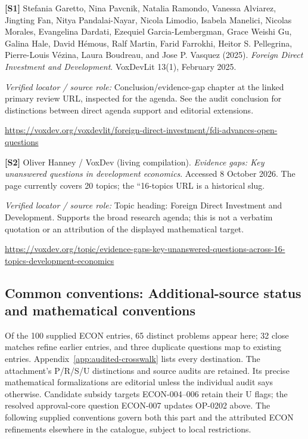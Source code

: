 \documentclass[11pt,a4paper]{article}
\begin{document}
{\footnotesize\raggedright
\par\noindent\textbf{[S1]} Stefania Garetto, Nina Pavcnik, Natalia Ramondo, Vanessa Alviarez, Jingting Fan, Nitya Pandalai-Nayar, Nicola Limodio, Isabela Manelici, Nicolas Morales, Evangelina Dardati, Ezequiel Garcia-Lembergman, Grace Weishi Gu, Galina Hale, David Hémous, Ralf Martin, Farid Farrokhi, Heitor S. Pellegrina, Pierre-Louis Vézina, Laura Boudreau, and Jose P. Vasquez (2025). \emph{Foreign Direct Investment and Development}. VoxDevLit 13(1), February 2025.\par \textit{Verified locator / source role:} Conclusion/evidence-gap chapter at the linked primary review URL, inspected for the agenda. See the audit conclusion for distinctions between direct agenda support and editorial extensions.\par \url{https://voxdev.org/voxdevlit/foreign-direct-investment/fdi-advances-open-questions}\par\smallskip
\par\noindent\textbf{[S2]} Oliver Hanney / VoxDev (living compilation). \emph{Evidence gaps: Key unanswered questions in development economics}. Accessed 8 October 2026. The page currently covers 20 topics; the ``16-topics URL is a historical slug.\par \textit{Verified locator / source role:} Topic heading: Foreign Direct Investment and Development. Supports the broad research agenda; this is not a verbatim quotation or an attribution of the displayed mathematical target.\par \url{https://voxdev.org/topic/evidence-gaps-key-unanswered-questions-across-16-topics-development-economics}\par\smallskip
}

\subsection*{Common conventions: Additional-source status and mathematical conventions}

\label{audited:conventions}

Of the 100 supplied ECON entries, 65 distinct problems appear here; 32 close
matches refine earlier entries, and three duplicate questions map to existing
entries. Appendix~\ref{app:audited-crosswalk} lists every destination.
The attachment's P/R/S/U distinctions and source audits are retained. Its
precise mathematical formalizations are editorial unless the individual audit
says otherwise. Candidate subsidy targets ECON-004--006 retain their U flags;
the resolved approval-core question ECON-007 updates OP-0202 above.
The following supplied conventions govern both this part and the attributed
ECON refinements elsewhere in the catalogue, subject to local restrictions.
\end{document}
